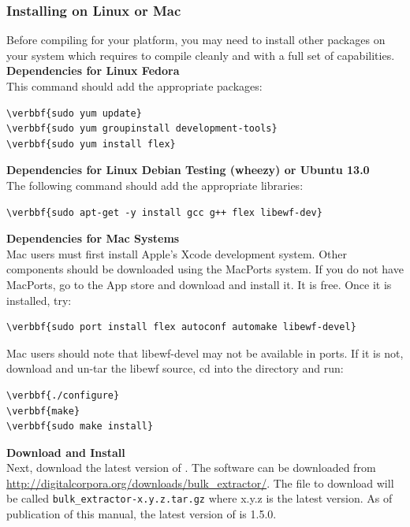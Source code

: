 \documentclass[11pt]{article} %
\begin{document}
\subsubsection{Installing on Linux or Mac}
\label{InstallOnLinuxMac}
Before compiling \bulk for your platform, you may need to install other packages on your system which \bulk requires to compile cleanly and with a full set of capabilities.\\

\textbf{Dependencies for Linux Fedora}\\
This command should add the appropriate packages:
\begin{Verbatim}[commandchars=\\\{\}]
\verbbf{sudo yum update}
\verbbf{sudo yum groupinstall development-tools}
\verbbf{sudo yum install flex}
\end{Verbatim}

\textbf{Dependencies for Linux Debian Testing (wheezy) or Ubuntu 13.0}\\
The following command should add the appropriate libraries:
\begin{Verbatim}[commandchars=\\\{\}]
\verbbf{sudo apt-get -y install gcc g++ flex libewf-dev} 
\end{Verbatim}

\textbf{Dependencies for Mac Systems}\\
Mac users must first install Apple's Xcode development system. Other components should be downloaded using the MacPorts system. If you do not have MacPorts, go to the App store and download and install it. It is free. Once it is installed, try:
\begin{Verbatim}[commandchars=\\\{\}]
\verbbf{sudo port install flex autoconf automake libewf-devel}
\end{Verbatim}

Mac users should note that libewf-devel may not be available in ports.  If it is not, download and un-tar the libewf source, cd into the directory and run:
\begin{Verbatim}[commandchars=\\\{\}]
\verbbf{./configure} 
\verbbf{make}
\verbbf{sudo make install}
\end{Verbatim}

\textbf{Download and Install \bulk}\\
Next, download the latest version of \bulk. The software can be downloaded from \url{http://digitalcorpora.org/downloads/bulk_extractor/}. The file to download will be called \texttt{bulk\_extractor-x.y.z.tar.gz} where x.y.z is the latest version. As of publication of this manual, the latest version of \bulk is 1.5.0. \\
\end{document}
